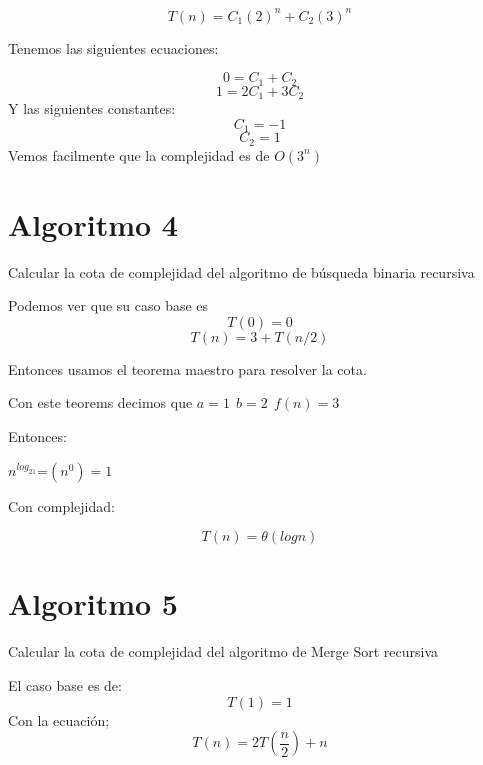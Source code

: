 \documentclass[12pt, fleqn]{article}                             %
\theoremstyle{break}                                            %
\begin{document}
    \begin{equation*}
        T(n)=C_1(2)^n+C_2(3)^n
    \end{equation*}

    Tenemos las siguientes ecuaciones:

    \begin{equation*}
        0=C_1+C_2
    \end{equation*}
    \begin{equation*}
        1=2C_1+3C_2
    \end{equation*}
    Y las siguientes constantes:
    \begin{equation*}
        C_1=-1
    \end{equation*} 
    \begin{equation*}
        C_2=1
    \end{equation*}
    Vemos facilmente que la complejidad es de $O(3^n)$     
\section{Algoritmo 4}
Calcular la cota de complejidad del algoritmo de búsqueda binaria recursiva


Podemos ver que su caso base es
\begin{equation*}
    T(0)=0
\end{equation*}
\begin{equation*}
    T(n)=3+T(n/2)
\end{equation*}

Entonces usamos el teorema maestro para resolver la cota.

Con este teorems decimos que $a=1\:\:b=2\:\:f(n)=3$

Entonces:

$n^{log_21}$=$(n^0)=1$

Con complejidad:

\begin{equation*}
    T(n)=\theta(log n)
\end{equation*}

\section{Algoritmo 5}
Calcular la cota de complejidad del algoritmo de Merge Sort recursiva


El caso base es de:
\begin{equation*}
    T(1)=1
\end{equation*}
Con la ecuación;
\begin{equation*}
    T(n)=2T(\dfrac{n}{2})+n
\end{equation*}
\end{document}
